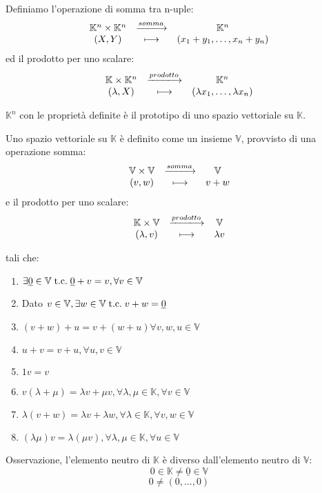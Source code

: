 \documentclass[a4paper,12pt]{article}
\begin{document}
	Definiamo l'operazione di somma tra n-uple:
	\[
	\begin{array}{c c c}
		\mathbb{K}^n \times \mathbb{K}^n & \xlongrightarrow{somma} & \mathbb{K}^n \\
		(X, Y) & \longmapsto & (x_1 + y_1, \dots, x_n + y_n) \\
	\end{array}
	\]	
	ed il prodotto per uno scalare:
	\[
	\begin{array}{c c c}
		\mathbb{K} \times \mathbb{K}^n & \xlongrightarrow{prodotto} & \mathbb{K}^n \\
		(\lambda, X) & \longmapsto & (\lambda x_1, \dots, \lambda x_n) \\
	\end{array}
	\]	
	
	$\mathbb{K}^n$ con le proprietà definite è il prototipo di uno spazio vettoriale su $\mathbb{K}$.
	
	Uno spazio vettoriale su $\mathbb{K}$ è definito come un insieme $\mathbb{V}$, provvisto di una operazione somma:
	\[
	\begin{array}{c c c}
		\mathbb{V} \times \mathbb{V} & \xlongrightarrow{somma} & \mathbb{V} \\
		(v, w) & \longmapsto & v + w \\
	\end{array}
	\]	
	e il prodotto per uno scalare:
	\[
	\begin{array}{c c c}
		\mathbb{K} \times \mathbb{V} & \xlongrightarrow{prodotto} & \mathbb{V} \\
		(\lambda, v) & \longmapsto & \lambda v \\
	\end{array}
	\]	
	
	tali che:
	\begin{enumerate}
		\item $\exists \underline{0} \in \mathbb{V} \;\text{t.c.}\; \underline{0} + v = v, \forall v \in \mathbb{V}$
		\item Dato $v \in \mathbb{V}, \exists w \in \mathbb{V} \;\text{t.c.}\; v + w = \underline{0}$
		\item $(v + w) + u = v + (w + u) \forall v,w,u \in \mathbb{V}$
		\item $u + v = v + u, \forall u,v \in \mathbb{V}$ 
		\item $1v = v$
		\item $v(\lambda + \mu) = \lambda v + \mu v, \forall \lambda, \mu \in \mathbb{K}, \forall v \in \mathbb{V}$
		\item $\lambda (v + w) = \lambda v + \lambda w, \forall \lambda \in \mathbb{K}, \forall v, w \in \mathbb{V}$
		\item $(\lambda \mu)v = \lambda(\mu v), \forall \lambda, \mu \in \mathbb{K}, \forall u \in \mathbb{V}$
	\end{enumerate}
	Osservazione, l'elemento neutro di $\mathbb{K}$ è diverso dall'elemento neutro di $\mathbb{V}$:
	\[0 \in \mathbb{K} \not = \underline{0} \in \mathbb{V}\]
	\[0 \not = (0, \dots, 0)\]
	
\end{document}
